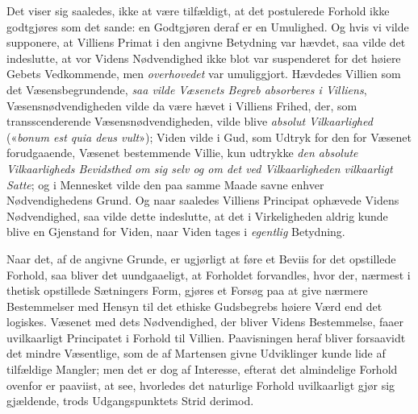 \documentclass[12pt,a4paper]{book}
\newcommand{\opage}[1]{\marginnote{\footnotesize\textit{[#1]}}}
\begin{document}
\opage{61}Det viser sig saaledes, ikke at være tilfældigt, at det postulerede Forhold ikke
godtgjøres som det sande: en Godtgjøren deraf er en Umulighed. Og hvis vi vilde
supponere, at Villiens Primat i den angivne Betydning var hævdet, saa vilde det
indeslutte, at vor Videns Nødvendighed ikke blot var suspenderet for det høiere
Gebets Vedkommende, men \emph{overhovedet} var umuliggjort. Hævdedes Villien som det
Væsensbegrundende, \emph{saa vilde Væsenets Begreb absorberes i Villiens},
Væsensnødvendigheden vilde da være hævet i Villiens Frihed, der, som
transscenderende Væsensnødvendigheden, vilde blive \emph{absolut Vilkaarlighed}
(«\textit{bonum est quia deus vult}»); Viden vilde i Gud, som Udtryk for den for
Væsenet forudgaaende, Væsenet bestemmende Villie, kun udtrykke \emph{den absolute Vilkaarligheds Bevidsthed om sig selv og om det ved Vilkaarligheden vilkaarligt Satte}; og i Mennesket vilde den paa samme Maade savne enhver Nødvendighedens Grund.
Og naar saaledes Villiens Principat ophævede Videns Nødvendighed, saa vilde dette
indeslutte, at det i Virkeligheden aldrig kunde blive en Gjenstand for Viden, naar
Viden tages i \emph{egentlig} Betydning.

Naar det, af de angivne Grunde, er ugjørligt at føre et Beviis for det opstillede
Forhold, saa bliver det uundgaaeligt, at Forholdet forvandles, hvor der, nærmest i
thetisk opstillede Sætningers Form, gjøres et Forsøg paa at give nærmere
Bestemmelser med Hensyn til det ethiske Gudsbegrebs høiere Værd end det logiskes.
Væsenet med dets Nødvendighed, der bliver Videns Bestemmelse, faaer uvilkaarligt
Principatet i Forhold til Villien. Paavisningen heraf bliver forsaavidt det mindre
Væsentlige, som de af Martensen givne Udviklinger kunde lide af tilfældige Mangler;
men det er dog af Interesse, efterat det almindelige Forhold ovenfor er paaviist, at
see, hvorledes det naturlige Forhold uvilkaarligt gjør sig gjældende, trods
Udgangspunktets Strid derimod.
\end{document}
